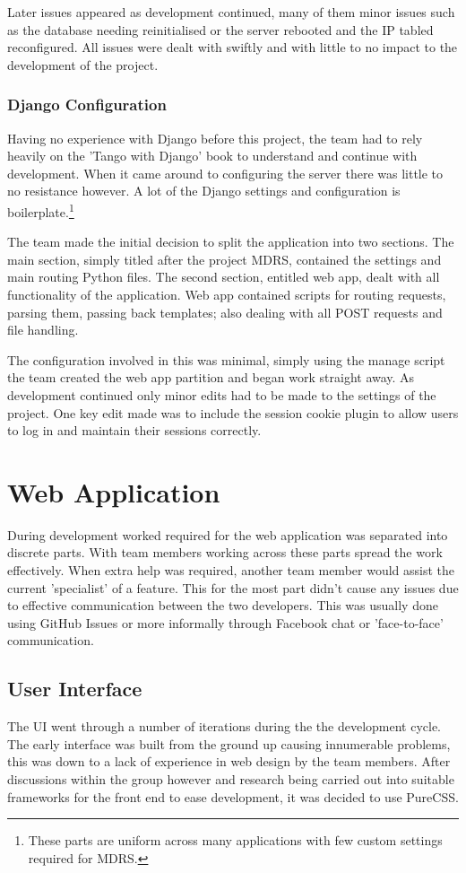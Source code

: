\documentclass{l3proj}
\begin{document}
Later issues appeared as development continued, many of them minor issues such as the database needing reinitialised or the server rebooted and the IP tabled reconfigured. All issues were dealt with swiftly and with little to no impact to the development of the project.

\subsubsection{Django Configuration}		Having no experience with Django before this project, the team had to rely heavily on the 'Tango with Django' book to understand and continue with development. When it came around to configuring the server there was little to no resistance however. A lot of the Django settings and configuration is boilerplate.\footnote{These parts are uniform across many applications with few custom settings required for MDRS.}

The team made the initial decision to split the application into two sections. The main section, simply titled after the project MDRS, contained the settings and main routing Python files. The second section, entitled web app, dealt with all functionality of the application. Web app contained scripts for routing requests, parsing them, passing back templates; also dealing with all POST requests and file handling.

The configuration involved in this was minimal, simply using the manage script the team created the web app partition and began work straight away. As development continued only minor edits had to be made to the settings of the project. One key edit made was to include the session cookie plugin to allow users to log in and maintain their sessions correctly.

\section{Web Application}		During development worked required for the web application was separated into discrete parts. With team members working across these parts spread the work effectively. When extra help was required, another team member would assist the current 'specialist' of a feature. This for the most part didn't cause any issues due to effective communication between the two developers. This was usually done using GitHub Issues or more informally through Facebook chat or 'face-to-face' communication.

\subsection{User Interface}		The UI went through a number of iterations during the the development cycle. The early interface was built from the ground up causing innumerable problems, this was down to a lack of experience in web design by the team members. After discussions within the group however and research being carried out into suitable frameworks for the front end to ease development, it was decided to use PureCSS.
\end{document}
